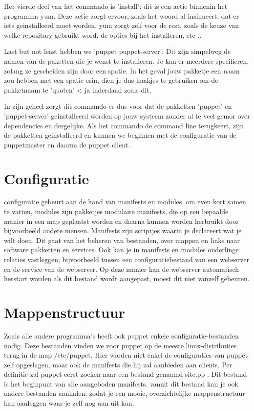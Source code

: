 Het vierde deel van het commando is 'install': dit is een actie binnenin het programma yum. Deze actie zorgt ervoor, zoals het woord al insinueert, dat er iets geinstalleerd moet worden. yum zorgt zelf voor de rest, zoals de keuze van welke repository gebruikt word, de opties bij het installeren, etc ..

Last but not least hebben we 'puppet puppet-server': Dit zijn simpelweg de namen van de paketten die je wenst te installeren. Je kan er meerdere specifieren, zolang ze gescheiden zijn door een spatie. In het geval jouw pakketje een naam zou hebben met een spatie erin, dien je dus haakjes te gebruiken om de pakketnaam te 'quoten' < ja inderdaad zoals dit.

In zijn geheel zorgt dit commando er dus voor dat de pakketten 'puppet' en 'puppet-server' geinstalleerd worden op jouw systeem zonder al te veel gemor over dependencies en dergelijke. Als het commando de command line terugkeert, zijn de pakketten geinstalleerd en kunnen we beginnen met de configuratie van de puppetmaster en daarna de puppet client.

\section{Configuratie}
configuratie gebeurt aan de hand van manifests en modules. om even kort samen te vatten, modules zijn pakketjes modulaire manifests, die op een bepaalde manier in een map geplaatst worden en daarna kunnen worden herbruikt door bijvoorbeeld andere mensen. Manifests zijn scriptjes waarin je declareert wat je wilt doen. Dit gaat van het beheren van bestanden, over mappen en links naar software pakketten en services.
Ook kan je in manifests en modules onderlinge relaties vastleggen, bijvoorbeeld tussen een configuratiebestand van een webserver en de service van de webserver. Op deze manier kan de webserver automatisch herstart worden als dit bestand wordt aangepast, moest dit niet vanzelf gebeuren.

\section{Mappenstructuur}
Zoals alle andere programma's heeft ook puppet enkele configuratie-bestanden nodig. Deze bestanden vinden we voor puppet op de meeste linux-distributies terug in de map /etc/puppet. Hier worden niet enkel de configuraties van puppet zelf opgeslagen, maar ook de manifests die hij zal aanbieden aan clients. Per definitie zal puppet eerst zoeken naar een bestand genaamd site.pp . Dit bestand is het beginpunt van alle aangeboden manifests. vanuit dit bestand kan je ook andere bestanden aanhalen, zodat je een mooie, overzichtelijke mappenstructuur kan aanleggen waar je zelf nog aan uit kan.

